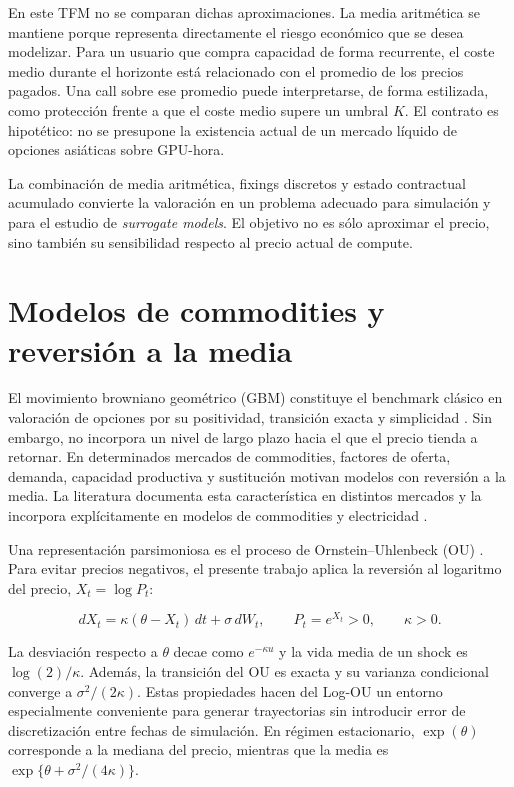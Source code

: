 En este TFM no se comparan dichas aproximaciones. La media aritmética se mantiene
porque representa directamente el riesgo económico que se desea modelizar. Para
un usuario que compra capacidad de forma recurrente, el coste medio durante el
horizonte está relacionado con el promedio de los precios pagados. Una call sobre
ese promedio puede interpretarse, de forma estilizada, como protección frente a que
el coste medio supere un umbral $K$. El contrato es hipotético: no se presupone la
existencia actual de un mercado líquido de opciones asiáticas sobre GPU-hora.

La combinación de media aritmética, fixings discretos y estado contractual
acumulado convierte la valoración en un problema adecuado para simulación y para
el estudio de \textit{surrogate models}. El objetivo no es sólo aproximar el precio,
sino también su sensibilidad respecto al precio actual de compute.

\section{Modelos de commodities y reversión a la media}
\label{sec:commodity_mean_reversion}

El movimiento browniano geométrico (GBM) constituye el benchmark clásico en
valoración de opciones por su positividad, transición exacta y simplicidad
\cite{black_scholes_1973,merton_1973,uned_mod7_2026}. Sin embargo, no incorpora un
nivel de largo plazo hacia el que el precio tienda a retornar. En determinados
mercados de commodities, factores de oferta, demanda, capacidad productiva y
sustitución motivan modelos con reversión a la media. La literatura documenta esta
característica en distintos mercados y la incorpora explícitamente en modelos de
commodities y electricidad
\cite{bessembinder1995meanreversion,gibson_schwartz_1990,schwartz_1997,
lucia_schwartz_2002,cartea_figueroa_2005}.

Una representación parsimoniosa es el proceso de Ornstein--Uhlenbeck (OU)
\cite{uhlenbeck_ornstein_1930}. Para evitar precios negativos, el presente trabajo
aplica la reversión al logaritmo del precio, $X_t=\log P_t$:

\begin{equation}
    dX_t=\kappa(\theta-X_t)\,dt+\sigma\,dW_t,
    \qquad
    P_t=e^{X_t}>0,
    \qquad \kappa>0 .
    \label{eq:logou_literature}
\end{equation}

La desviación respecto a $\theta$ decae como $e^{-\kappa u}$ y la vida media de
un shock es $\log(2)/\kappa$. Además, la transición del OU es exacta y su varianza
condicional converge a $\sigma^2/(2\kappa)$. Estas propiedades hacen del Log-OU un
entorno especialmente conveniente para generar trayectorias sin introducir error
de discretización entre fechas de simulación. En régimen estacionario,
$\exp(\theta)$ corresponde a la mediana del precio, mientras que la media es
$\exp\{\theta+\sigma^2/(4\kappa)\}$.

